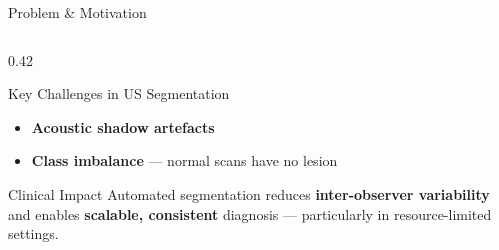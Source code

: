 \documentclass[aspectratio=169,10pt]{beamer}
\begin{document}
\begin{frame}{Problem \& Motivation}
\begin{columns}[T]
\begin{column}{0.42\textwidth}
\begin{exampleblock}{Key Challenges in US Segmentation}
\begin{itemize}
          \item \textbf{Acoustic shadow artefacts}
          \item \textbf{Class imbalance} --- normal scans have no lesion
        \end{itemize}
      \end{exampleblock}
      \vspace{4pt}
      \begin{block}{Clinical Impact}
        Automated segmentation reduces \textbf{inter-observer variability}
        and enables \textbf{scalable, consistent} diagnosis --- particularly
        in resource-limited settings.
      \end{block}
    \end{column}
  \end{columns}
\end{frame}
\end{document}
